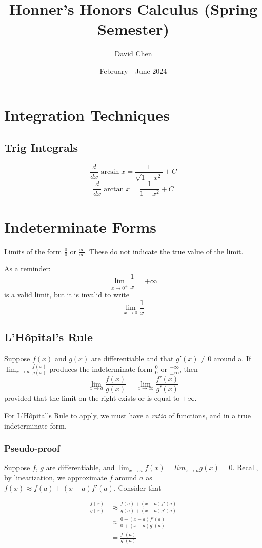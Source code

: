 \documentclass{article}
\title{Honner's Honors Calculus (Spring Semester)}
\author{David Chen}
\date{February - June 2024}
\begin{document}
\maketitle
\section{Integration Techniques}
\subsection{Trig Integrals}

$$ \frac{d}{dx} \arcsin{x} = \frac{1}{\sqrt{1 - x^2}} + C $$
$$ \frac{d}{dx} \arctan{x} = \frac{1}{1 + x^2} + C $$

\section{Indeterminate Forms}
Limits of the form $\frac{0}{0}$ or $\frac{\infty}{\infty}$. These do not indicate the true value of the limit.

As a reminder:
$$\lim_{x \to 0^+} \frac{1}{x} = + \infty$$
is a valid limit, but it is invalid to write $$\lim_{x \to 0} \frac{1}{x}$$

\subsection{L'Hôpital's Rule}
Suppose $f(x)$ and $g(x)$ are differentiable and that $g'(x) \ne 0$ around a. If $\lim_{x\to a} \frac{f(x)}{g(x)}$ produces the indeterminate form $\frac{0}{0}$ or $\frac{\pm \infty}{\pm \infty}$, then $$\lim_{x \to a} \frac{f(x)}{g(x)} = \lim_{x \to \infty} \frac{f'(x)}{g'(x)}$$ provided that the limit on the right exists or is equal to $\pm \infty$.

For L'Hôpital's Rule to apply, we must have a \emph{ratio} of functions, and in a true indeterminate form.

\subsubsection{Pseudo-proof}
Suppose $f$, $g$ are differentiable, and $\lim_{x \to a} f(x) = lim_{x \to a} g(x) = 0$. Recall, by linearization, we approximate $f$ around $a$ as $f(x) \approx f(a) + (x-a)f'(a)$. Consider that                                                                                              

\begin{align*}
   \frac{f(x)}{g(x)} & \approx \frac{f(a) + (x-a)f'(a)}{g(a) + (x-a)g'(a)} \\
                     & \approx \frac{0 + (x-a)f'(a)}{0 + (x-a)g'(a)} \\
                     &       = \frac{f'(a)}{g'(a)}
\end{align*}
\end{document}

